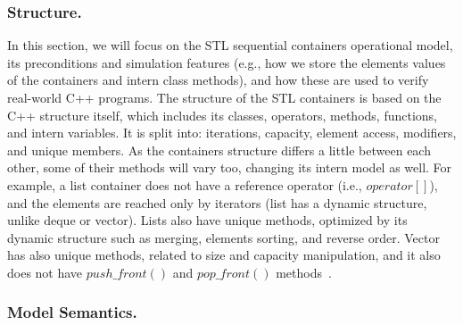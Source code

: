 \documentclass[a4paper]{llncs}
\newcommand{\comment}[1]{}
\begin{document}

\subsubsection{Structure.}

In this section, we will focus on the STL sequential
containers operational model, its preconditions and
simulation features (e.g., how we store the elements
values of the containers and intern class methods),
and how these are used to verify real-world C++ programs.
The structure of the STL containers is based on the
C++ structure itself, which includes its classes, operators,
methods, functions, and intern variables. It is split into:
iterations, capacity, element access, modifiers, and unique
members. As the containers structure differs a little
between each other, some of their methods will vary too,
changing its intern model as well. For example, a list container
does not have a reference operator (i.e., $operator\left[\right]$), and the elements
are reached only by iterators (list has a dynamic structure,
unlike deque or vector). Lists also have unique methods, optimized by its
dynamic structure such as merging, elements sorting, and reverse order.
Vector has also unique methods, related to size and capacity manipulation,
and it also does not have $push\_front\left(\right)$
and $pop\_front\left(\right)$ methods~\cite{CppReference12}.

\subsubsection{Model Semantics.}

\comment{
Let us consider that a container model is composed
by five types of variables, which are: $I$, $C$,
$N$, $P$ and $T$. Let $I$ be an iterator that points
to a position in the container; $C$ be a container itself;
$N$ be a natural integer number used in the container
such as size, capacity and elements index; $P$ be
the memory address where $T$ is located; and $T$ be the
values stored in the container.
For convention, we assume that
$\left(c, v, d, l\right) \subset C, \{i, j, n\}
\subset N$ and $\{it1, it2\} \subset I$.}
\end{document}
